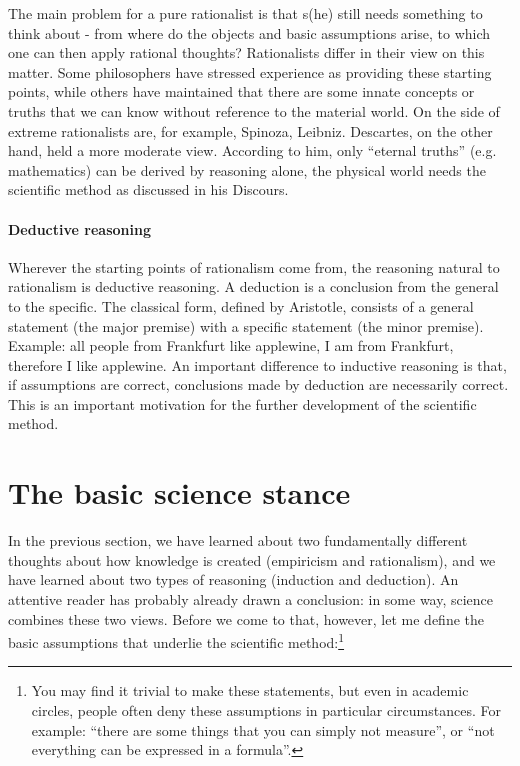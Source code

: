 \documentclass{tufte-book}
\begin{document}
The main problem for a pure rationalist is that s(he) still needs something to think  about - from where do the objects and basic assumptions arise, to which one can then apply rational thoughts? Rationalists differ in their view on this matter. Some philosophers have stressed experience as providing these starting points, while others have maintained that there are some innate concepts or truths that we can know without reference to the material world. On the side of extreme rationalists are, for example, Spinoza, Leibniz. Descartes, on the other hand, held a more moderate view. According to him, only “eternal truths” (e.g. mathematics) can be derived by reasoning alone, the physical world needs the scientific method as discussed in his Discours.

\paragraph{Deductive reasoning}Wherever the starting points of rationalism come from, the reasoning natural to rationalism is deductive reasoning. A deduction is a conclusion from the general to the specific. The classical form, defined by Aristotle, consists of a general statement (the major premise) with a specific statement (the minor premise). Example: all people from Frankfurt like applewine, I am from Frankfurt, therefore I like applewine. An important difference to inductive reasoning is that, if assumptions are correct, conclusions made by deduction are necessarily correct. This is an important motivation for the further development of the scientific method.


\section{The basic science stance}

In the previous section, we have learned about two fundamentally different thoughts about how knowledge is created (empiricism and rationalism), and we have learned about two types of reasoning (induction and deduction). An attentive reader has probably already drawn a conclusion: in some way, science combines these two views. Before we come to that, however, let me define the basic assumptions that underlie the scientific method:\footnote{You may find it trivial to make these statements, but even in academic circles, people often deny these assumptions in particular circumstances. For example: ``there are some things that you can simply not measure'', or ``not everything can be expressed in a formula''.}
\end{document}
